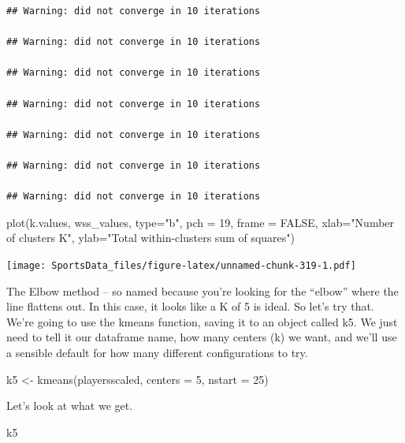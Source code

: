 \documentclass[
]{book}
\newenvironment{Shaded}{\begin{snugshade}}{\end{snugshade}}
\newcommand{\AttributeTok}[1]{\textcolor[rgb]{0.77,0.63,0.00}{#1}}
\newcommand{\ConstantTok}[1]{\textcolor[rgb]{0.00,0.00,0.00}{#1}}
\newcommand{\DecValTok}[1]{\textcolor[rgb]{0.00,0.00,0.81}{#1}}
\newcommand{\FunctionTok}[1]{\textcolor[rgb]{0.00,0.00,0.00}{#1}}
\newcommand{\NormalTok}[1]{#1}
\newcommand{\OtherTok}[1]{\textcolor[rgb]{0.56,0.35,0.01}{#1}}
\newcommand{\StringTok}[1]{\textcolor[rgb]{0.31,0.60,0.02}{#1}}
\begin{document}
\begin{verbatim}
## Warning: did not converge in 10 iterations

## Warning: did not converge in 10 iterations

## Warning: did not converge in 10 iterations

## Warning: did not converge in 10 iterations

## Warning: did not converge in 10 iterations

## Warning: did not converge in 10 iterations

## Warning: did not converge in 10 iterations
\end{verbatim}

\begin{Shaded}
\begin{Highlighting}[]
\FunctionTok{plot}\NormalTok{(k.values, wss\_values,}
       \AttributeTok{type=}\StringTok{"b"}\NormalTok{, }\AttributeTok{pch =} \DecValTok{19}\NormalTok{, }\AttributeTok{frame =} \ConstantTok{FALSE}\NormalTok{, }
       \AttributeTok{xlab=}\StringTok{"Number of clusters K"}\NormalTok{,}
       \AttributeTok{ylab=}\StringTok{"Total within{-}clusters sum of squares"}\NormalTok{)}
\end{Highlighting}
\end{Shaded}

\texttt{[image: SportsData\_files/figure-latex/unnamed-chunk-319-1.pdf]}

The Elbow method -- so named because you're looking for the ``elbow'' where the line flattens out. In this case, it looks like a K of 5 is ideal. So let's try that. We're going to use the kmeans function, saving it to an object called k5. We just need to tell it our dataframe name, how many centers (k) we want, and we'll use a sensible default for how many different configurations to try.

\begin{Shaded}
\begin{Highlighting}[]
\NormalTok{k5 }\OtherTok{\textless{}{-}} \FunctionTok{kmeans}\NormalTok{(playersscaled, }\AttributeTok{centers =} \DecValTok{5}\NormalTok{, }\AttributeTok{nstart =} \DecValTok{25}\NormalTok{)}
\end{Highlighting}
\end{Shaded}

Let's look at what we get.

\begin{Shaded}
\begin{Highlighting}[]
\NormalTok{k5}
\end{Highlighting}
\end{Shaded}
\end{document}
